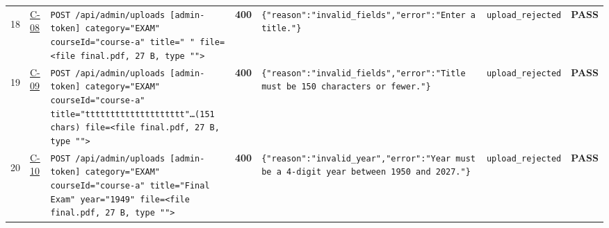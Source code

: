 \documentclass[10pt,a4paper]{article}
\begin{document}
\begin{landscape}
\begin{longtable}{@{}P{0.6cm}P{0.9cm}P{8.5cm}P{1.0cm}P{6.2cm}P{4.2cm}P{1.1cm}@{}}
\hypertarget{call18}{18} & \hyperlink{test-C-08}{C-08} & \texttt{POST /\allowbreak{}api/\allowbreak{}admin/\allowbreak{}uploads [admin-\allowbreak{}token] category=\allowbreak{}"\allowbreak{}EXAM"\allowbreak{} courseId=\allowbreak{}"\allowbreak{}course-\allowbreak{}a"\allowbreak{} title=\allowbreak{}"\allowbreak{}   "\allowbreak{} file=\allowbreak{}<file final.\allowbreak{}pdf,\allowbreak{} 27 B,\allowbreak{} type "\allowbreak{}"\allowbreak{}>} & \textcolor{warnamber}{\textbf{400}} & \texttt{\{"\allowbreak{}reason"\allowbreak{}:\allowbreak{}"\allowbreak{}invalid\_\allowbreak{}fields"\allowbreak{},\allowbreak{}"\allowbreak{}error"\allowbreak{}:\allowbreak{}"\allowbreak{}Enter a title.\allowbreak{}"\allowbreak{}\}} & \texttt{upload\_\allowbreak{}rejected} & \textcolor{passgreen}{\textbf{PASS}} \\
\hypertarget{call19}{19} & \hyperlink{test-C-09}{C-09} & \texttt{POST /\allowbreak{}api/\allowbreak{}admin/\allowbreak{}uploads [admin-\allowbreak{}token] category=\allowbreak{}"\allowbreak{}EXAM"\allowbreak{} courseId=\allowbreak{}"\allowbreak{}course-\allowbreak{}a"\allowbreak{} title=\allowbreak{}"\allowbreak{}tttttttttttttttttt\allowbreak{}tt"\allowbreak{}…(151 chars) file=\allowbreak{}<file final.\allowbreak{}pdf,\allowbreak{} 27 B,\allowbreak{} type "\allowbreak{}"\allowbreak{}>} & \textcolor{warnamber}{\textbf{400}} & \texttt{\{"\allowbreak{}reason"\allowbreak{}:\allowbreak{}"\allowbreak{}invalid\_\allowbreak{}fields"\allowbreak{},\allowbreak{}"\allowbreak{}error"\allowbreak{}:\allowbreak{}"\allowbreak{}Title must be 150 characters or fewer.\allowbreak{}"\allowbreak{}\}} & \texttt{upload\_\allowbreak{}rejected} & \textcolor{passgreen}{\textbf{PASS}} \\
\hypertarget{call20}{20} & \hyperlink{test-C-10}{C-10} & \texttt{POST /\allowbreak{}api/\allowbreak{}admin/\allowbreak{}uploads [admin-\allowbreak{}token] category=\allowbreak{}"\allowbreak{}EXAM"\allowbreak{} courseId=\allowbreak{}"\allowbreak{}course-\allowbreak{}a"\allowbreak{} title=\allowbreak{}"\allowbreak{}Final Exam"\allowbreak{} year=\allowbreak{}"\allowbreak{}1949"\allowbreak{} file=\allowbreak{}<file final.\allowbreak{}pdf,\allowbreak{} 27 B,\allowbreak{} type "\allowbreak{}"\allowbreak{}>} & \textcolor{warnamber}{\textbf{400}} & \texttt{\{"\allowbreak{}reason"\allowbreak{}:\allowbreak{}"\allowbreak{}invalid\_\allowbreak{}year"\allowbreak{},\allowbreak{}"\allowbreak{}error"\allowbreak{}:\allowbreak{}"\allowbreak{}Year must be a 4-\allowbreak{}digit year between 1950 and 2027.\allowbreak{}"\allowbreak{}\}} & \texttt{upload\_\allowbreak{}rejected} & \textcolor{passgreen}{\textbf{PASS}} \\

\end{longtable}
\end{landscape}
\end{document}
